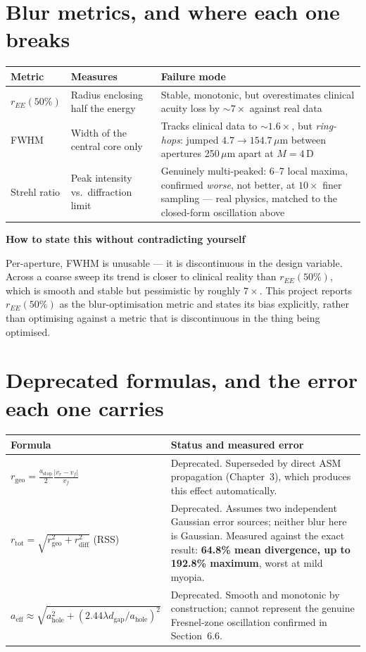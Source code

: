 \documentclass[11pt]{report}
\newenvironment{keybox}[1]%
{\par\vspace{6pt}\begin{lrbox}{\kbsave}\begin{minipage}{0.88\textwidth}%
{\bfseries\color{hbblue}#1}\par\vspace{4pt}\ignorespaces}%
{\end{minipage}\end{lrbox}%
\begin{center}\setlength{\fboxrule}{1.2pt}\setlength{\fboxsep}{7pt}%
\fcolorbox{hbblue}{boxgrey}{\usebox{\kbsave}}\end{center}\vspace{6pt}\par}
\begin{document}
\section{Blur metrics, and where each one breaks}

\begin{center}
\begin{tabular}{p{2.7cm}p{5.0cm}p{5.7cm}}
\toprule
Metric & Measures & Failure mode \\
\midrule
$r_{EE}(50\%)$ & Radius enclosing half the energy & Stable, monotonic, but overestimates
clinical acuity loss by $\sim7\times$ against real data \\
FWHM & Width of the central core only & Tracks clinical data to $\sim1.6\times$, but
\emph{ring-hops}: jumped $4.7\to154.7\,\mu$m between apertures 250\,$\mu$m apart at
$M=4$\,D \\
Strehl ratio & Peak intensity vs.\ diffraction limit & Genuinely multi-peaked: 6--7 local
maxima, confirmed \emph{worse}, not better, at $10\times$ finer sampling --- real physics,
matched to the closed-form oscillation above \\
\bottomrule
\end{tabular}
\end{center}

\begin{keybox}{How to state this without contradicting yourself}
Per-aperture, FWHM is unusable --- it is discontinuous in the design variable. Across a
coarse sweep its trend is closer to clinical reality than $r_{EE}(50\%)$, which is smooth
and stable but pessimistic by roughly $7\times$. This project reports $r_{EE}(50\%)$ as the
blur-optimisation metric and states its bias explicitly, rather than optimising against a
metric that is discontinuous in the thing being optimised.
\end{keybox}

\section{Deprecated formulas, and the error each one carries}

\begin{center}
\begin{tabular}{p{5.0cm}p{7.5cm}}
\toprule
Formula & Status and measured error \\
\midrule
$r_{\text{geo}} = \frac{a_{\text{stop}}}{2}\frac{|v_r-v_f|}{v_f}$ & Deprecated. Superseded
by direct ASM propagation (Chapter~3), which produces this effect automatically. \\
$r_{\text{tot}}=\sqrt{r_{\text{geo}}^2+r_{\text{diff}}^2}$ (RSS) & Deprecated. Assumes two
independent Gaussian error sources; neither blur here is Gaussian. Measured against the
exact result: \textbf{64.8\% mean divergence, up to 192.8\% maximum}, worst at mild myopia. \\
$a_{\text{eff}} \approx \sqrt{a_{\text{hole}}^2+(2.44\lambda d_{\text{gap}}/a_{\text{hole}})^2}$
& Deprecated. Smooth and monotonic by construction; cannot represent the genuine Fresnel-zone
oscillation confirmed in Section~6.6. \\
\bottomrule
\end{tabular}
\end{center}
\end{document}

